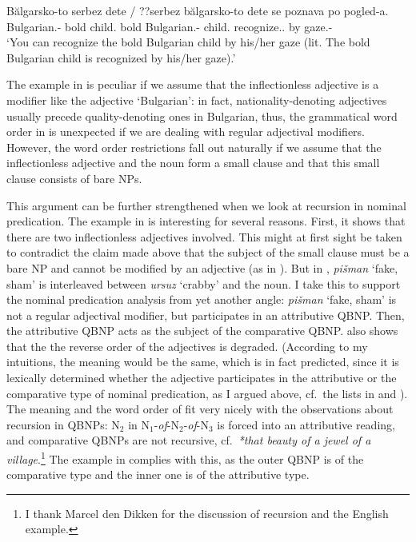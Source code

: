 \documentclass[output=paper]{langscibook}
\begin{document}
\ea \label{ge-ex-adj-intrl}
\gll B\u{a}lgarsko-to serbez dete / ??serbez b\u{a}lgarsko-to dete se poznava po pogled-a.\\
Bulgarian.\N{}-\Def{} bold child.\N{} {} \phantom{??}bold Bulgarian.\N{}-\Def{} child.\N{} \Refl{} recognize.\Prs{}.\Tsg{} by gaze.\M{}-\Def{} \\
\glt `You can recognize the bold Bulgarian child by his\slash her gaze  (lit. The bold Bulgarian child is recognized by his\slash her gaze).' 
\z 

\noindent The example in  is peculiar if we assume that the inflectionless adjective is a modifier like the adjective `Bulgarian': in fact, nationality-denoting adjectives usually precede quality-denoting ones in Bulgarian, thus, the grammatical word order in  is unexpected if we are dealing with regular adjectival modifiers. However, the word order restrictions fall out naturally if we assume that the inflectionless adjective and the noun form a small clause and that this small clause consists of bare NPs. 

This argument can be further strengthened when we look at recursion in nominal predication. The example in  is interesting for several reasons. First, it shows that there are two inflectionless adjectives involved. This might at first sight be taken to contradict the claim made above that the subject of the small clause must be a bare NP and cannot be modified by an adjective (as in ). But in , \emph{pi\v{s}man} `fake, sham' is interleaved between \emph{ursuz} `crabby' and the noun. I take this to support the nominal predication analysis from yet another angle: \emph{pi\v{s}man} `fake, sham' is not a regular adjectival modifier, but participates in an attributive QBNP. Then, the attributive QBNP acts as the subject of the comparative QBNP.  also shows that the the reverse order of the adjectives is degraded. (According to my intuitions, the meaning would be the same, which is in fact predicted, since it is lexically determined whether the adjective participates in the attributive or the comparative type of nominal predication, as I argued above, cf.\ the lists in  and ). The meaning and the word order of  fit very nicely with the observations about recursion in QBNPs: N$_2$ in N$_1$\nobreakdash-\emph{of}\nobreakdash-N$_2$\nobreakdash-\emph{of}\nobreakdash-N$_3$ is forced into an attributive reading, and comparative QBNPs are not recursive, cf.\ \emph{*that beauty of a jewel of a village}.\footnote{I thank Marcel den Dikken for the discussion of recursion and the English example.} The example in  complies with this, as the outer QBNP is of the comparative type and the inner one is of the attributive type. %
\end{document}
